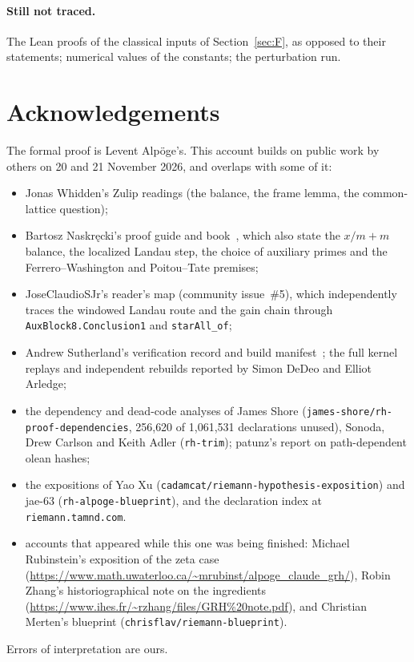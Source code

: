 \documentclass[11pt]{article}
\theoremstyle{plain}
\theoremstyle{definition}
\begin{document}
\paragraph{Still not traced.} The Lean proofs of the classical inputs of Section~\ref{sec:F}, as
opposed to their statements; numerical values of the constants; the perturbation run.

\section*{Acknowledgements}

The formal proof is Levent Alp\"oge's. This account builds on public work by others on 20 and 21
November 2026, and overlaps with some of it:
\begin{itemize}
\item Jonas Whidden's Zulip readings (the balance, the frame lemma, the common-lattice question);
\item Bartosz Naskr\k{e}cki's proof guide and book~\cite{naskrecki}, which also state the
  $x/m+m$ balance, the localized Landau step, the choice of auxiliary primes and the
  Ferrero--Washington and Poitou--Tate premises;
\item JoseClaudioSJr's reader's map (community issue~\#5), which independently traces the windowed
  Landau route and the gain chain through \texttt{AuxBlock8.Conclusion1} and \texttt{starAll\_of};
\item Andrew Sutherland's verification record and build manifest~\cite{sutherland}; the full kernel replays and
  independent rebuilds reported by Simon DeDeo and Elliot Arledge;
\item the dependency and dead-code analyses of James Shore (\texttt{james-shore/rh-proof-dependencies},
  256{,}620 of 1{,}061{,}531 declarations unused), Sonoda, Drew Carlson and Keith Adler
  (\texttt{rh-trim}); patunz's report on path-dependent olean hashes;
\item the expositions of Yao Xu (\texttt{cadamcat/riemann-hypothesis-exposition}) and jae-63
  (\texttt{rh-alpoge-blueprint}), and the declaration index at \texttt{riemann.tamnd.com}.
\item accounts that appeared while this one was being finished: Michael Rubinstein's exposition of
  the zeta case (\url{https://www.math.uwaterloo.ca/~mrubinst/alpoge_claude_grh/}), Robin Zhang's
  historiographical note on the ingredients (\url{https://www.ihes.fr/~rzhang/files/GRH%20note.pdf}),
  and Christian Merten's blueprint (\texttt{chrisflav/riemann-blueprint}).
\end{itemize}
Errors of interpretation are ours.
\end{document}
